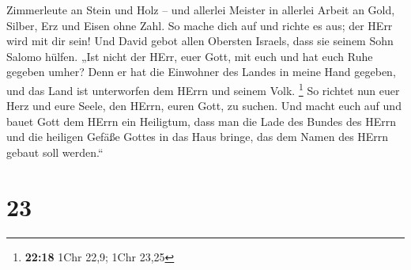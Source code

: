 Zimmerleute an Stein und Holz -- und allerlei Meister in allerlei Arbeit
 an Gold, Silber, Erz und Eisen ohne Zahl. So mache dich
auf und richte es aus; der HErr wird mit dir sein!  Und
David gebot allen Obersten Israels, dass sie seinem Sohn Salomo hülfen.
 „Ist nicht der HErr, euer Gott, mit euch und hat euch
Ruhe gegeben umher? Denn er hat die Einwohner des Landes in meine Hand
gegeben, und das Land ist unterworfen dem HErrn und seinem Volk.
\footnote{\textbf{22:18} 1Chr 22,9; 1Chr 23,25}  So
richtet nun euer Herz und eure Seele, den HErrn, euren Gott, zu suchen.
Und macht euch auf und bauet Gott dem HErrn ein Heiligtum, dass man die
Lade des Bundes des HErrn und die heiligen Gefäße Gottes in das Haus
bringe, das dem Namen des HErrn gebaut soll werden.``

\hypertarget{section-22}{%
\section{23}\label{section-22}}

